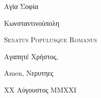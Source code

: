 \documentclass[a4paper,12pt]{article}
\newcommand{\recipientaddress}{
    \begingroup
            \sffamily
            \mdseries
            \footnotesize
            \setlength{\baselineskip}{14pt}
            \setlength{\parskip}{0pt}

            Αγία Σοφία
            
            Κωνσταντινούπολη
            
            \scshape 
            Senatus Populusque Romanus

    \endgroup
}
\begin{document}
    \pagestyle{plain}
    \rmfamily\normalsize
    \setlength{\parskip}{13pt}
    \setlength{\baselineskip}{17pt}
    \RaggedRight

    \recipientaddress\vspace{10mm}

    \normalsize

    Αγαπητέ Χρήστος,

    \lipsum[1]

    \lipsum[2]

    Amen,\newline
    Νερυτηες

    {\footnotesize XX Αύγουστος MMXXI}
\end{document}
